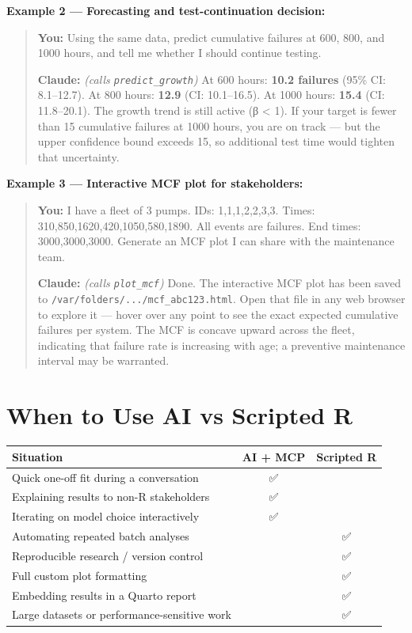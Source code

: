 \documentclass[
  letterpaper,
  DIV=11,
  numbers=noendperiod]{scrreprt}
\newcounter{none} %
\begin{document}
\textbf{Example 2 --- Forecasting and test-continuation decision:}

\begin{quote}
\textbf{You:} Using the same data, predict cumulative failures at 600,
800, and 1000 hours, and tell me whether I should continue testing.

\textbf{Claude:} \emph{(calls \texttt{predict\_growth})} At 600 hours:
\textbf{10.2 failures} (95\% CI: 8.1--12.7). At 800 hours: \textbf{12.9}
(CI: 10.1--16.5). At 1000 hours: \textbf{15.4} (CI: 11.8--20.1). The
growth trend is still active (β \textless{} 1). If your target is fewer
than 15 cumulative failures at 1000 hours, you are on track --- but the
upper confidence bound exceeds 15, so additional test time would tighten
that uncertainty.
\end{quote}

\textbf{Example 3 --- Interactive MCF plot for stakeholders:}

\begin{quote}
\textbf{You:} I have a fleet of 3 pumps. IDs: 1,1,1,2,2,3,3. Times:
310,850,1620,420,1050,580,1890. All events are failures. End times:
3000,3000,3000. Generate an MCF plot I can share with the maintenance
team.

\textbf{Claude:} \emph{(calls \texttt{plot\_mcf})} Done. The interactive
MCF plot has been saved to \texttt{/var/folders/.../mcf\_abc123.html}.
Open that file in any web browser to explore it --- hover over any point
to see the exact expected cumulative failures per system. The MCF is
concave upward across the fleet, indicating that failure rate is
increasing with age; a preventive maintenance interval may be warranted.
\end{quote}

\section{When to Use AI vs Scripted
R}\label{when-to-use-ai-vs-scripted-r}

{\def\LTcaptype{none} %
\begin{longtable}[]{@{}lcc@{}}
\toprule\noalign{}
Situation & AI + MCP & Scripted R \\
\midrule\noalign{}
\endhead
\bottomrule\noalign{}
\endlastfoot
Quick one-off fit during a conversation & ✅ & \\
Explaining results to non-R stakeholders & ✅ & \\
Iterating on model choice interactively & ✅ & \\
Automating repeated batch analyses & & ✅ \\
Reproducible research / version control & & ✅ \\
Full custom plot formatting & & ✅ \\
Embedding results in a Quarto report & & ✅ \\
Large datasets or performance-sensitive work & & ✅ \\
\end{longtable}
}
\end{document}
